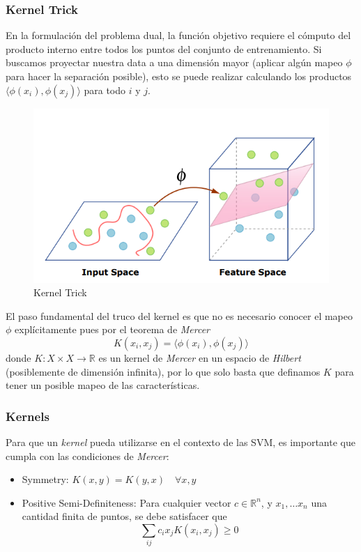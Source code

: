 \subsubsection{Kernel Trick}

En la formulación del problema dual, la función objetivo requiere el cómputo del producto interno entre todos los puntos del conjunto de entrenamiento. Si buscamos proyectar nuestra data a una dimensión mayor (aplicar algún mapeo $\phi$ para hacer la separación posible), esto se puede realizar calculando los productos $ \langle \phi(x_i) , \phi(x_j) \rangle $ para todo $i$ y $j$.

\begin{figure}[H]
    \center
    \includegraphics[scale=0.5]{notebooks/ML/img/kernel_trick.png}
    \caption{Kernel Trick}
\end{figure}

El paso fundamental del truco del kernel es que no es necesario conocer el mapeo $\phi$ explícitamente pues por el teorema de \textit{Mercer}
$$
K(x_i , x_j) = \langle \phi(x_i) , \phi(x_j) \rangle
$$
donde $K: X \times X \rightarrow \mathbb{R} $ es un kernel de \textit{Mercer} en un espacio de \textit{Hilbert} (posiblemente de dimensión infinita), por lo que solo basta que definamos $K$ para tener un posible mapeo de las características. 

\subsubsection{Kernels}

Para que un \textit{kernel} pueda utilizarse en el contexto de las SVM, es importante que cumpla con las condiciones de \textit{Mercer}: 
\begin{itemize}
    \item Symmetry: $K(x,y) = K(y,x) \quad \forall x,y$ 
    \item Positive Semi-Definiteness: Para cualquier vector $c \in \mathbb{R}^n$, y $x_1 , \dots x_n$ una cantidad finita de puntos, se debe satisfacer que  
    $$\sum_{ij}c_ix_jK(x_i,x_j) \geq 0$$
\end{itemize}

